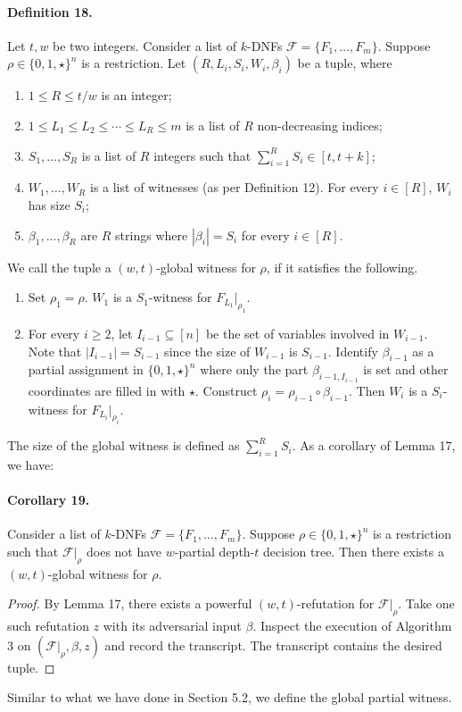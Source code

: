 \documentclass[10pt,a4paper]{article}
\begin{document}
\paragraph{Definition 18.} Let $t,w$ be two integers. Consider a list of $k$-DNFs $\mathcal F=\{F_1,\ldots,F_m\}$. Suppose $\rho\in\{0,1,\star\}^n$ is a restriction. Let $(R,L_i,S_i,W_i,\beta_i)$ be a tuple, where
\begin{enumerate}\item $1\le R\le t/w$ is an integer;
\item $1\le L_1\le L_2\le\cdots\le L_R\le m$ is a list of $R$ non-decreasing indices;
\item $S_1,\ldots,S_R$ is a list of $R$ integers such that $\sum_{i=1}^RS_i\in[t,t+k]$;
\item $W_1,\ldots,W_R$ is a list of witnesses (as per Definition 12). For every $i\in[R]$, $W_i$ has size $S_i$;
\item $\beta_1,\ldots,\beta_R$ are $R$ strings where $|\beta_i|=S_i$ for every $i\in[R]$.\end{enumerate}
We call the tuple a $(w,t)$-global witness for $\rho$, if it satisfies the following.
\begin{enumerate}\item Set $\rho_1=\rho$. $W_1$ is a $S_1$-witness for $F_{L_1}|_{\rho_1}$.
\item For every $i\ge2$, let $I_{i-1}\subseteq[n]$ be the set of variables involved in $W_{i-1}$. Note that $|I_{i-1}|=S_{i-1}$ since the size of $W_{i-1}$ is $S_{i-1}$. Identify $\beta_{i-1}$ as a partial assignment in $\{0,1,\star\}^n$ where only the part $\beta_{i-1,I_{i-1}}$ is set and other coordinates are filled in with $\star$. Construct $\rho_i=\rho_{i-1}\circ\beta_{i-1}$. Then $W_i$ is a $S_i$-witness for $F_{L_i}|_{\rho_i}$.\end{enumerate}
The size of the global witness is defined as $\sum_{i=1}^RS_i$. As a corollary of Lemma 17, we have:
\paragraph{Corollary 19.} Consider a list of $k$-DNFs $\mathcal F=\{F_1,\ldots,F_m\}$. Suppose $\rho\in\{0,1,\star\}^n$ is a restriction such that $\mathcal F|_\rho$ does not have $w$-partial depth-$t$ decision tree. Then there exists a $(w,t)$-global witness for $\rho$.
\begin{proof}By Lemma 17, there exists a powerful $(w,t)$-refutation for $\mathcal F|_\rho$. Take one such refutation $z$ with its adversarial input $\beta$. Inspect the execution of Algorithm 3 on $(\mathcal F|_\rho,\beta,z)$ and record the transcript. The transcript contains the desired tuple.\end{proof}
Similar to what we have done in Section 5.2, we define the global partial witness.
\end{document}

